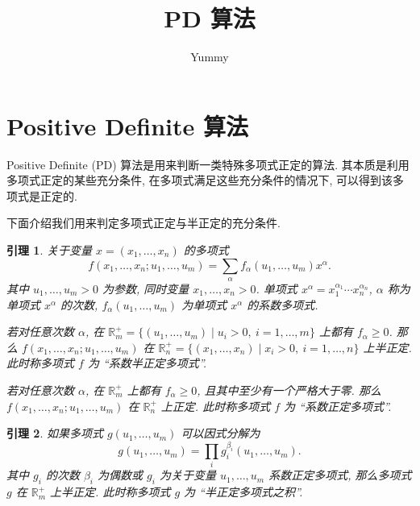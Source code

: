 \documentclass[10pt,a4paper]{ctexart}
\newtheorem{Lemma}{引理}
\begin{document}
\title{PD 算法}
\author{Yummy}

\maketitle

\section{Positive Definite 算法}

Positive Definite (PD) 算法是用来判断一类特殊多项式正定的算法. 其本质是利用多项式正定的某些充分条件, 在多项式满足这些充分条件的情况下, 可以得到该多项式是正定的.

下面介绍我们用来判定多项式正定与半正定的充分条件.

\begin{Lemma}\label{le:CoeffPD}
  关于变量 $x = (x_1, \dots, x_n)$ 的多项式
  \begin{equation*}
    f(x_1, \dots, x_n; u_1, \dots, u_m) = \sum_{\alpha} f_{\alpha}(u_1,\dots,u_m) x^{\alpha}.
  \end{equation*}
  其中 $u_1, \dots, u_m > 0$ 为参数, 同时变量 $x_1, \dots, x_n > 0$. 单项式 $x^{\alpha} = x_1^{\alpha_1} \cdots x_n^{\alpha_n}$, $\alpha$ 称为单项式 $x^\alpha$ 的次数, $f_{\alpha}(u_1, \dots, u_m)$ 为单项式 $x^{\alpha}$ 的系数多项式.

  若对任意次数 $\alpha$, 在 $\mathbb{R}_{m}^{+} = \{(u_1, \dots, u_m) \mid u_i > 0,\ i = 1, \dots, m\}$ 上都有 $f_{\alpha} \geq 0$. 那么 $f(x_1, \dots, x_n; u_1, \dots, u_m)$ 在 $\mathbb{R}_{n}^{+} = \{(x_1, \dots, x_n) \mid x_i > 0,\ i = 1, \dots, n\}$ 上半正定. 此时称多项式 $f$ 为 ``系数半正定多项式''.

  若对任意次数 $\alpha$, 在 $\mathbb{R}_{m}^{+}$ 上都有 $f_{\alpha} \geq 0$, 且其中至少有一个严格大于零. 那么 $f(x_1, \dots, x_n; u_1, \dots, u_m)$ 在 $\mathbb{R}_{n}^{+}$ 上正定. 此时称多项式 $f$ 为 ``系数正定多项式''.
\end{Lemma}

\begin{Lemma}\label{le:SemiPDProd}
  如果多项式 $g(u_1, \dots, u_m)$ 可以因式分解为
  \begin{equation*}
    g(u_1, \dots, u_m) = \prod_{i} g_i^{\beta_i}(u_1, \dots, u_m).
  \end{equation*}
  其中 $g_i$ 的次数 $\beta_i$ 为偶数或 $g_i$ 为关于变量 $u_1, \dots, u_m$ 系数正定多项式, 那么多项式 $g$ 在 $\mathbb{R}_m^+$ 上半正定. 此时称多项式 $g$ 为 ``半正定多项式之积''.
\end{Lemma}
\end{document}
